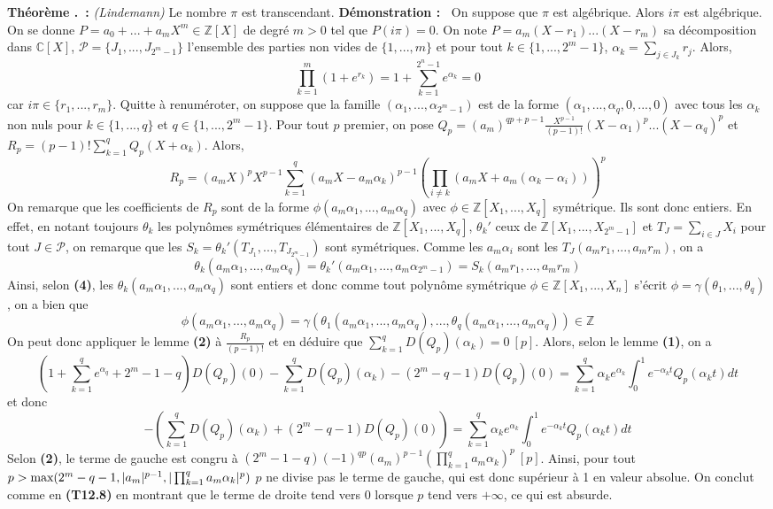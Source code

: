\documentclass[5pt,a4paper]{article}
\newcounter{thm}[section]
\renewcommand{\thethm}{\thesection.\arabic{thm}}
\newcommand{\thm}[1]{\stepcounter{thm}\noindent\textbf{Théorème \thethm ~:} #1 \newline}
\newcommand{\demo}[1]{\textbf{Démonstration :~} #1 \newline}
\begin{document}
\begin{onehalfspacing}
\thm{\textit{(Lindemann)} Le nombre $\pi$ est transcendant.}
\demo{On suppose que $\pi$ est algébrique. Alors $i\pi$ est algébrique. On se donne $P = a_0 + ... + a_mX^m \in \mathbb{Z}[X]$ de degré $m > 0$ tel que $P(i\pi) = 0$. On note $P = a_m(X - r_1)...(X - r_m)$ sa décomposition dans $\mathbb{C}[X]$, $\mathcal{P} = \{J_1, ..., J_{2^m - 1}\}$ l'ensemble des parties non vides de $\{1, ..., m\}$ et pour tout $k \in \{1, ..., 2^m - 1\}$, $\alpha_k = \sum_{j \in J_k} r_j$. Alors, 
\[\prod_{k=1}^m (1 + e^{r_k}) = 1 + \sum_{k = 1}^{2^n - 1} e^{\alpha_k} = 0\] car $i\pi \in \{r_1, ..., r_m\}$. Quitte à renuméroter, on suppose que la famille $(\alpha_1, ..., \alpha_{2^m - 1})$ est de la forme $(\alpha_1, ..., \alpha_q, 0, ..., 0)$ avec tous les $\alpha_k$ non nuls pour $k \in \{1, ..., q\}$ et $q \in \{1, ..., 2^m - 1\}$. Pour tout $p$ premier, on pose $Q_p = (a_m)^{qp + p - 1}\frac{X^{p-1}}{(p-1)!}(X - \alpha_1)^p...(X-\alpha_q)^p$ et $R_p = (p-1)!\sum_{k=1}^q Q_p(X + \alpha_k)$. Alors, 
\[R_p = (a_mX)^pX^{p-1} \sum_{k=1}^q (a_mX - a_m\alpha_k)^{p-1}(\prod_{i \neq k} (a_mX + a_m(\alpha_k - \alpha_i)))^p\]
On remarque que les coefficients de $R_p$ sont de la forme $\phi(a_m\alpha_1, ..., a_m\alpha_q)$ avec $\phi \in \mathbb{Z}[X_1, ..., X_q]$ symétrique. Ils sont donc entiers. En effet, en notant toujours $\theta_k$ les polynômes symétriques élémentaires de $\mathbb{Z}[X_1, ..., X_q]$, $\theta_k'$ ceux de $\mathbb{Z}[X_1, ..., X_{2^m - 1}]$ et $T_J = \sum_{i \in J} X_i$ pour tout $J \in \mathcal{P}$, on remarque que les $S_k = \theta_k'(T_{J_1}, ..., T_{J_{2^m - 1}})$ sont symétriques. Comme les $a_m\alpha_i$ sont les $T_J(a_mr_1, ..., a_mr_m)$, on a 
\[ \theta_k(a_m\alpha_1, ..., a_m\alpha_q) = \theta_k'(a_m\alpha_1, ..., a_m\alpha_{2^m-1}) = S_k(a_mr_1, ..., a_mr_m)\]
Ainsi, selon \textbf{(4)}, les $\theta_k(a_m\alpha_1, ..., a_m\alpha_q)$ sont entiers et donc comme tout polynôme symétrique $\phi \in \mathbb{Z}[X_1, ..., X_n]$ s'écrit $\phi = \gamma(\theta_1, ..., \theta_q)$, on a bien que 
\[ \phi(a_m\alpha_1, ..., a_m\alpha_q) = \gamma(\theta_1(a_m\alpha_1, ..., a_m\alpha_q), ..., \theta_q(a_m\alpha_1, ..., a_m\alpha_q)) \in \mathbb{Z}\]
On peut donc appliquer le lemme \textbf{(2)} à $\frac{R_p}{(p-1)!}$ et en déduire que $\sum_{k=1}^q D(Q_p)(\alpha_k) = 0~[p]$. Alors, selon le lemme \textbf{(1)}, on a
\[ (1 + \sum_{k=1}^q e^{\alpha_q} + 2^m - 1 - q)D(Q_p)(0) - \sum_{k=1}^q D(Q_p)(\alpha_k) - (2^m - q - 1)D(Q_p)(0) = \sum_{k=1}^q \alpha_ke^{\alpha_k} \int_0^1 e^{-\alpha_kt}Q_p(\alpha_kt)dt\]
et donc 
\[ -(\sum_{k=1}^q D(Q_p)(\alpha_k) + (2^m - q - 1)D(Q_p)(0)) = \sum_{k=1}^q \alpha_ke^{\alpha_k} \int_0^1 e^{-\alpha_kt}Q_p(\alpha_kt)dt\]
Selon \textbf{(2)}, le terme de gauche est congru à $(2^m - 1 - q)(-1)^{qp}(a_m)^{p-1}(\prod_{k=1}^q a_m\alpha_k)^p~[p]$. Ainsi, pour tout $p > \textup{max}(2^m - q - 1, |a_m|^{p-1}, |\prod_{k=1}^q a_m\alpha_k|^p)$ $p$ ne divise pas le terme de gauche, qui est donc supérieur à 1 en valeur absolue. On conclut comme en \textbf{(T12.8)} en montrant que le terme de droite tend vers 0 lorsque $p$ tend vers $+\infty$, ce qui est absurde.}


\end{onehalfspacing}
\end{document}
